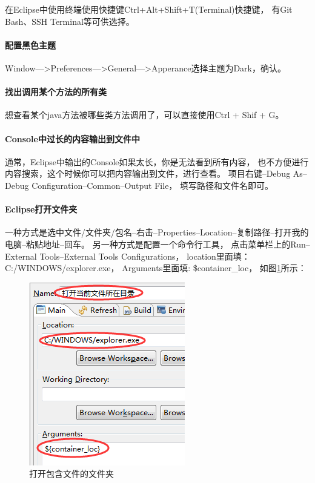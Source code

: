 \documentclass{book}
\begin{document}
在Eclipse中使用终端使用快捷键Ctrl+Alt+Shift+T(Terminal)快捷键，
有Git Bash、SSH Terminal等可供选择。

\paragraph{配置黑色主题}

Window—>Preferences—>General—>Apperance选择主题为Dark，确认。

\paragraph{找出调用某个方法的所有类}

想查看某个java方法被哪些类方法调用了，可以直接使用Ctrl + Shif + G。

\paragraph{Console中过长的内容输出到文件中}

通常，Eclipse中输出的Console如果太长，你是无法看到所有内容，
也不方便进行内容搜索，这个时候你可以把内容输出到文件，进行查看。
项目右键--Debug As--Debug Configuration--Common--Output File，
填写路径和文件名即可。

\paragraph{Eclipse打开文件夹}

一种方式是选中文件/文件夹/包名--右击--Properties--Location--复制路径--打开我的电脑--粘贴地址--回车。
另一种方式是配置一个命令行工具，
点击菜单栏上的Run--External Tools--External Tools Configurations，
location里面填：C:/WINDOWS/explorer.exe，
Arguments里面填: \${container\_loc}，
如图\ref{code:OpenCurrentFileContainer}所示：

\begin{figure}[htbp]
	\centering
	\includegraphics[scale=0.5]{OpenCurrentFileContainer.png}
	\caption{打开包含文件的文件夹}
	\label{code:OpenCurrentFileContainer}
\end{figure}
\end{document}
